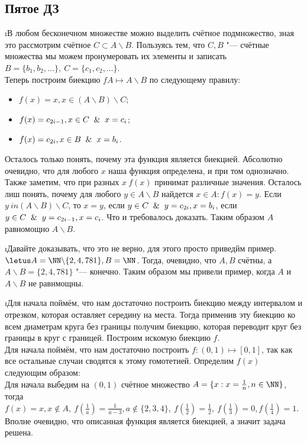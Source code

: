 \subsection{Пятое ДЗ}


\i В любом бесконечном множестве можно выделить счётное подмножество, зная это рассмотрим счётное $C \subset A \backslash B$. Пользуясь тем, что $C, B$ "--- счётные множества мы можем пронумеровать их элементы и записать $B = \{b_1, b_2, \ldots \}, \ C = \{c_1, c_2, \ldots \}$.\\
Теперь построим биекцию $f A \mapsto A \backslash B$ по следующему правилу:
\begin{itemize}
    \item $f(x) = x, x \in (A \backslash B) \backslash C$;
    \item $f(x) = c_{2i-1}, x \in C \And x = c_i$;
    \item $f(x) = c_{2i}, x \in B \And x = b_i$.
\end{itemize}
Осталось только понять, почему эта функция является биекцией. Абсолютно очевидно, что для любого $x$ наша функция определена, и при том однозначно. Также заметим, что при разных $x\ f(x)$ принимат различные значения. Осталось лиш понять, почему для любого $y \in A \backslash B$ найдется $x \in A: f(x) = y$. Если $y \ in (A \backslash B) \backslash C$, то $x = y$, если $y \in C \And y = c_{2i}, x = b_i$, если $y \in C \And y = c_{2i-1}, x = c_i$. Что и требовалось доказать. Таким образом $A$ равномощно $A \backslash B$. 

\i Давайте доказывать, что это не верно, для этого просто приведйм пример.\\
$\letus A = \NN \backslash \{2, 4, 781\}, B = \NN$. Тогда, очевидно, что $A, B$ счётны, а $A \backslash B = \{2, 4, 781\}$ "--- конечно. Таким образом мы привели пример, когда $A$ и $A \backslash B$ не равнмощны.

\i Для начала поймём, что нам достаточно построить биекцию между интервалом и отрезком, которая оставляет середину на места. Тогда применив эту биекцию ко всем диаметрам круга без границы получим биекцию, которая переводит круг без границы в круг с границей. Построим искомую биекцию $f$.\\
Для начала поймём, что нам достаточно построить $f: (0, 1) \mapsto [0, 1]$, так как все остальные случаи сводятся к этому гомотетией. Определим $f(x)$ следующим образом:\\
Для начала выбедим на $(0, 1)$ счётное множество $A = \{x: x = \frac{1}{n}, n \in \NN\}$, тогда $f(x) = x, x \notin A,\ f(\frac{1}{a}) = \frac{1}{a-3}, a\notin \{2, 3, 4\},\ f(\frac{1}{2}) = \frac{1}{2},\ f(\frac{1}{3}) = 0, f(\frac{1}{4}) = 1$. Вполне очевидно, что описанная функция является биекцией, а значит задача решена.

